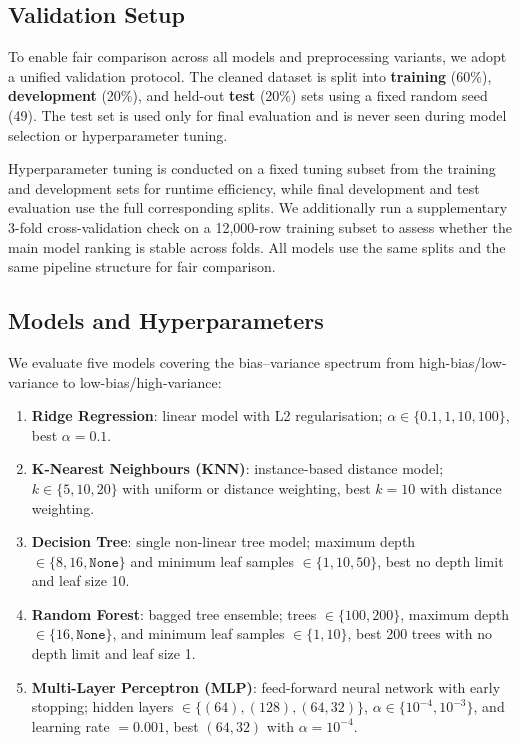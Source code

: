 \subsection{Validation Setup}
\label{sec:validation}

To enable fair comparison across all models and preprocessing variants, we adopt a unified validation protocol.
The cleaned dataset is split into \textbf{training} (60\%), \textbf{development} (20\%), and held-out \textbf{test} (20\%) sets using a fixed random seed (49).
The test set is used only for final evaluation and is never seen during model selection or hyperparameter tuning.

Hyperparameter tuning is conducted on a fixed tuning subset from the training and development sets for runtime efficiency, while final development and test evaluation use the full corresponding splits.
We additionally run a supplementary 3-fold cross-validation check on a 12{,}000-row training subset to assess whether the main model ranking is stable across folds.
All models use the same splits and the same pipeline structure for fair comparison.

\subsection{Models and Hyperparameters}
\label{sec:models}

We evaluate five models covering the bias--variance spectrum from high-bias/low-variance to low-bias/high-variance:

\begin{enumerate}
  \item \textbf{Ridge Regression}: linear model with L2 regularisation; $\alpha \in \{0.1, 1, 10, 100\}$, best $\alpha=0.1$.
  \item \textbf{K-Nearest Neighbours (KNN)}: instance-based distance model; $k \in \{5, 10, 20\}$ with uniform or distance weighting, best $k=10$ with distance weighting.
  \item \textbf{Decision Tree}: single non-linear tree model; maximum depth $\in \{8, 16, \texttt{None}\}$ and minimum leaf samples $\in \{1, 10, 50\}$, best no depth limit and leaf size 10.
  \item \textbf{Random Forest}: bagged tree ensemble; trees $\in \{100, 200\}$, maximum depth $\in \{16, \texttt{None}\}$, and minimum leaf samples $\in \{1, 10\}$, best 200 trees with no depth limit and leaf size 1.
  \item \textbf{Multi-Layer Perceptron (MLP)}: feed-forward neural network with early stopping; hidden layers $\in \{(64), (128), (64,32)\}$, $\alpha \in \{10^{-4}, 10^{-3}\}$, and learning rate $=0.001$, best $(64,32)$ with $\alpha=10^{-4}$.
\end{enumerate}

